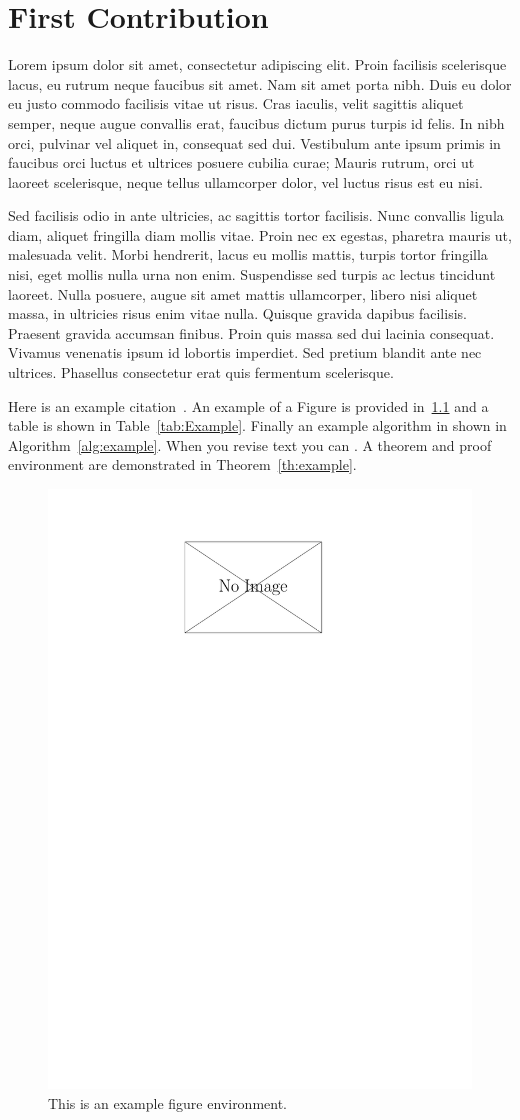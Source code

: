 \chapter{First Contribution\label{chap:Contribution1}}

Lorem ipsum dolor sit amet, consectetur adipiscing elit. Proin facilisis scelerisque lacus, eu rutrum neque faucibus sit amet. Nam sit amet porta nibh. Duis eu dolor eu justo commodo facilisis vitae ut risus. Cras iaculis, velit sagittis aliquet semper, neque augue convallis erat, faucibus dictum purus turpis id felis. In nibh orci, pulvinar vel aliquet in, consequat sed dui. Vestibulum ante ipsum primis in faucibus orci luctus et ultrices posuere cubilia curae; Mauris rutrum, orci ut laoreet scelerisque, neque tellus ullamcorper dolor, vel luctus risus est eu nisi.

Sed facilisis odio in ante ultricies, ac sagittis tortor facilisis. Nunc convallis ligula diam, aliquet fringilla diam mollis vitae. Proin nec ex egestas, pharetra mauris ut, malesuada velit. Morbi hendrerit, lacus eu mollis mattis, turpis tortor fringilla nisi, eget mollis nulla urna non enim. Suspendisse sed turpis ac lectus tincidunt laoreet. Nulla posuere, augue sit amet mattis ullamcorper, libero nisi aliquet massa, in ultricies risus enim vitae nulla. Quisque gravida dapibus facilisis. Praesent gravida accumsan finibus. Proin quis massa sed dui lacinia consequat. Vivamus venenatis ipsum id lobortis imperdiet. Sed pretium blandit ante nec ultrices. Phasellus consectetur erat quis fermentum scelerisque.

Here is an example citation~\cite{OMNIref}. An example of a Figure is provided in~\ref{fig:ExampleFigure} and a table is shown in Table~\ref{tab:Example}. Finally an example algorithm in shown in Algorithm~\ref{alg:example}. When you revise text you can . A theorem and proof environment are demonstrated in Theorem~\ref{th:example}.


\begin{figure}
	\centering
	\includegraphics[width=0.5\linewidth]{images/NoImage.pdf}
	\caption{This is an example figure environment.\label{fig:ExampleFigure}}
\end{figure}

